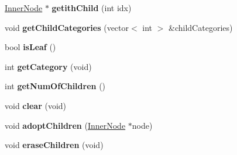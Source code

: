 \begin{DoxyCompactItemize}
\item 
\hypertarget{classMultiBoost_1_1InnerNode_a36ceff5c52ad1746f07214c35528522f}{\hyperlink{classMultiBoost_1_1InnerNode}{Inner\-Node} $\ast$ {\bfseries getith\-Child} (int idx)}\label{classMultiBoost_1_1InnerNode_a36ceff5c52ad1746f07214c35528522f}

\item 
\hypertarget{classMultiBoost_1_1InnerNode_adc0130bccd64256e969db83950ba14ad}{void {\bfseries get\-Child\-Categories} (vector$<$ int $>$ \&child\-Categories)}\label{classMultiBoost_1_1InnerNode_adc0130bccd64256e969db83950ba14ad}

\item 
\hypertarget{classMultiBoost_1_1InnerNode_ad2de29e80ea096fc72ed4f2e16666d38}{bool {\bfseries is\-Leaf} ()}\label{classMultiBoost_1_1InnerNode_ad2de29e80ea096fc72ed4f2e16666d38}

\item 
\hypertarget{classMultiBoost_1_1InnerNode_aed4dc37b0910c10b885c89b03ea8db81}{int {\bfseries get\-Category} (void)}\label{classMultiBoost_1_1InnerNode_aed4dc37b0910c10b885c89b03ea8db81}

\item 
\hypertarget{classMultiBoost_1_1InnerNode_ad62aefd8c0ca80c00713a31e3c9b91f6}{int {\bfseries get\-Num\-Of\-Children} ()}\label{classMultiBoost_1_1InnerNode_ad62aefd8c0ca80c00713a31e3c9b91f6}

\item 
\hypertarget{classMultiBoost_1_1InnerNode_a56586eb425fb74bb8083e58efb759de2}{void {\bfseries clear} (void)}\label{classMultiBoost_1_1InnerNode_a56586eb425fb74bb8083e58efb759de2}

\item 
\hypertarget{classMultiBoost_1_1InnerNode_a3bc08fceaebe172b95d9a7af11ca6a4a}{void {\bfseries adopt\-Children} (\hyperlink{classMultiBoost_1_1InnerNode}{Inner\-Node} $\ast$node)}\label{classMultiBoost_1_1InnerNode_a3bc08fceaebe172b95d9a7af11ca6a4a}

\item 
\hypertarget{classMultiBoost_1_1InnerNode_ab040a7f5cd554cb53156cc382f4cb611}{void {\bfseries erase\-Children} (void)}\label{classMultiBoost_1_1InnerNode_ab040a7f5cd554cb53156cc382f4cb611}

\end{DoxyCompactItemize}
